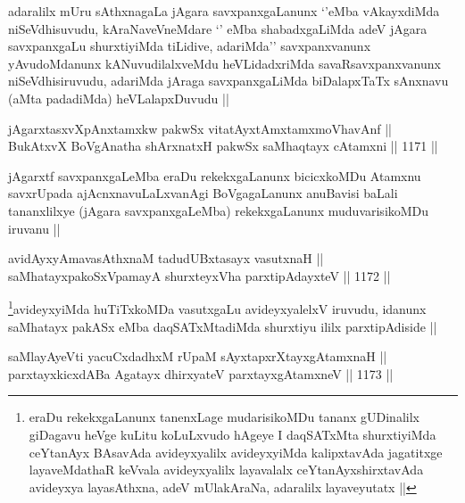 \begin{artha}
adaralilx mUru sAthxnagaLa jAgara savxpanxgaLanunx `\stext'eMba vAkayxdiMda niSeVdhisuvudu, kAraNaveVneMdare `\stext' eMba shabadxgaLiMda adeV jAgara savxpanxgaLu shurxtiyiMda tiLidive, adariMda'' savxpanxvanunx yAvudoMdanunx kANuvudilalxveMdu heVLidadxriMda savaRsavxpanxvanunx niSeVdhisiruvudu, adariMda jAraga savxpanxgaLiMda biDalapxTaTx sAnxnavu (aMta padadiMda) heVLalapxDuvudu ||
\end{artha}


\begin{shl}
jAgarxtasxvXpAnxtamxkw pakwSx vitatAyx\s \s tAmx\s \s tamxmoVhavAnf || \\
BukAtxvX BoVgAnatha shArxnatxH pakwSx saMhaqtayx cA\s \s tamxni ||  1171 ||  
\end{shl}

\begin{artha}
jAgarxtf savxpanxgaLeMba eraDu rekekxgaLanunx bicicxkoMDu Atamxnu savxrUpada ajAcnxnavuLaLxvanAgi BoVgagaLanunx anuBavisi baLali tananxlilxye (jAgara savxpanxgaLeMba) rekekxgaLanunx muduvarisikoMDu iruvanu ||
\end{artha}


\begin{shl}
avidAyxyAmavasAthxnaM tadudUBxtasayx vasutxnaH || \\
saMhatayxpakoSxVpamayA shurxteyxVha parxtipAdayxteV ||  1172 ||  
\end{shl}

\begin{artha}
\footnote{eraDu rekekxgaLanunx tanenxLage mudarisikoMDu tananx gUDinalilx giDagavu heVge kuLitu koLuLxvudo hAgeye I daqSATxMta shurxtiyiMda ceYtanAyx BAsavAda avideyxyalilx avideyxyiMda kalipxtavAda jagatitxge layaveMdathaR keVvala avideyxyalilx layavalalx ceYtanAyxshirxtavAda avideyxya layasAthxna, adeV mUlakAraNa, adaralilx layaveyutatx ||}avideyxyiMda huTiTxkoMDa vasutxgaLu avideyxyalelxV iruvudu, idanunx saMhatayx pakASx eMba daqSATxMtadiMda shurxtiyu ililx parxtipAdiside ||
\end{artha}


\begin{shl}
saMlayAyeVti yacuCxdadhxM rUpaM sAyxtapxrXtayxgAtamxnaH || \\
parxtayxkicxdABa Agatayx dhirxyateV parxtayxgAtamxneV ||  1173 ||  
\end{shl}

